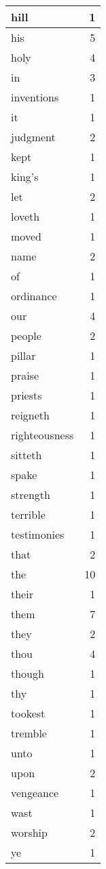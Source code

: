 \begin{center}
\begin{longtable}{l|r}
hill & 1 \\ \hline
his & 5 \\ \hline
holy & 4 \\ \hline
in & 3 \\ \hline
inventions & 1 \\ \hline
it & 1 \\ \hline
judgment & 2 \\ \hline
kept & 1 \\ \hline
king's & 1 \\ \hline
let & 2 \\ \hline
loveth & 1 \\ \hline
moved & 1 \\ \hline
name & 2 \\ \hline
of & 1 \\ \hline
ordinance & 1 \\ \hline
our & 4 \\ \hline
people & 2 \\ \hline
pillar & 1 \\ \hline
praise & 1 \\ \hline
priests & 1 \\ \hline
reigneth & 1 \\ \hline
righteousness & 1 \\ \hline
sitteth & 1 \\ \hline
spake & 1 \\ \hline
strength & 1 \\ \hline
terrible & 1 \\ \hline
testimonies & 1 \\ \hline
that & 2 \\ \hline
the & 10 \\ \hline
their & 1 \\ \hline
them & 7 \\ \hline
they & 2 \\ \hline
thou & 4 \\ \hline
though & 1 \\ \hline
thy & 1 \\ \hline
tookest & 1 \\ \hline
tremble & 1 \\ \hline
unto & 1 \\ \hline
upon & 2 \\ \hline
vengeance & 1 \\ \hline
wast & 1 \\ \hline
worship & 2 \\ \hline
ye & 1 \\ \hline
\end{longtable}
\end{center}



